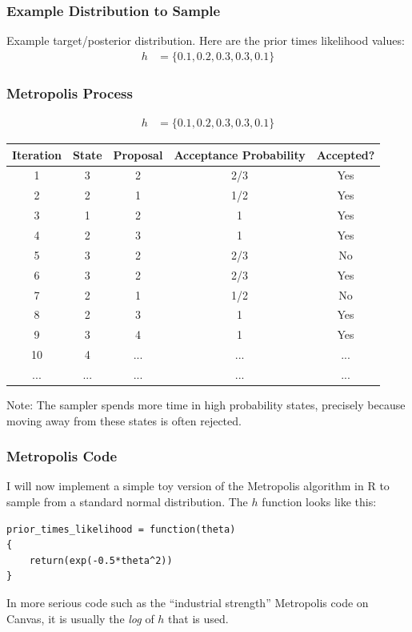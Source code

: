 \documentclass{beamer}
\begin{document}
\begin{frame}
\frametitle{Example Distribution to Sample}
Example target/posterior distribution. Here are the prior times likelihood
values:
\begin{align}
h &= \{ 0.1, 0.2, 0.3, 0.3, 0.1 \}
\end{align}

\end{frame}


\begin{frame}
\frametitle{Metropolis Process}
\begin{center}
\begin{align}
h &= \{ 0.1, 0.2, 0.3, 0.3, 0.1 \}
\end{align}
{\tiny
\begin{tabular}{|c|c|c|c|c|}
\hline
Iteration & State & Proposal & Acceptance Probability & Accepted? \\
\hline 
1         & 3     & 2        & 2/3                    & Yes \\
2         & 2     & 1        & 1/2                    & Yes \\
3         & 1     & 2        & 1                      & Yes \\
4         & 2     & 3        & 1                      & Yes \\
5         & 3     & 2        & 2/3                    & No  \\
6         & 3     & 2        & 2/3                    & Yes \\
7         & 2     & 1        & 1/2                    & No \\
8         & 2     & 3        & 1                      & Yes \\
9         & 3     & 4        & 1                      & Yes \\
10        & 4     & ... & ... & ... \\
... & ... & ... & ... & ...  \\
\hline
\end{tabular}
} %
\end{center}
\pause

Note: The sampler spends more time in high probability states, precisely
because moving away from these states is often rejected.
\end{frame}


\begin{frame}[fragile]
\frametitle{Metropolis Code}

I will now implement a simple toy version of the Metropolis algorithm in R
to sample from a standard normal distribution. The $h$ function looks like this:

\begin{verbatim}
prior_times_likelihood = function(theta)
{
    return(exp(-0.5*theta^2))
}
\end{verbatim}
\pause

In more serious code such as the ``industrial strength'' Metropolis code on
Canvas, it is usually the {\em log} of $h$ that is used.
\end{frame}
\end{document}
